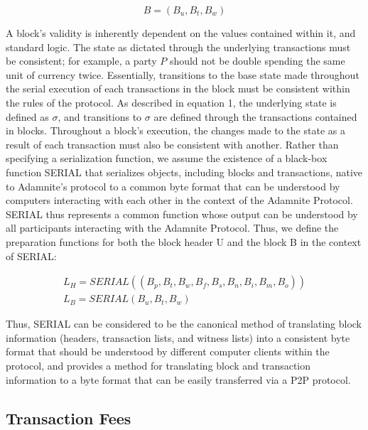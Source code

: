 \documentclass[conference]{IEEEtran}
\begin{document}
\begin{equation}
{B} = (B_{u}, B_{t}, B_{w})
\end{equation}

A block's validity is inherently dependent on the values contained within it, and standard logic. The state as dictated through the underlying transactions must be consistent; for example, a party $P$ should not be double spending the same unit of currency twice. Essentially, transitions to the base state made throughout the serial execution of each transactions in the block must be consistent within the rules of the protocol. As described in equation 1, the underlying state is defined as $\sigma$, and transitions to $\sigma$ are defined through the transactions contained in blocks. Throughout a block's execution, the changes made to the state as a result of each transaction must also be consistent with another.
Rather than specifying a serialization function, we assume the existence of a black-box function SERIAL that serializes objects, including blocks and transactions, native to Adamnite's protocol to a common byte format that can be understood by computers interacting with each other in the context of the Adamnite Protocol. SERIAL thus represents a common function whose output can be understood by all participants interacting with the Adamnite Protocol. Thus, we define the preparation functions for both the block header U and the block B in the context of SERIAL:

\begin{eqnarray}
{L_{H} = SERIAL((B_p,B_t,B_w,B_f,B_s,B_n,B_i,B_m,B_o))}\\
{L_{B}} = SERIAL(B_{u},B_{t},B_{w})
\end{eqnarray}


Thus, SERIAL can be considered to be the canonical method of translating block information (headers, transaction lists, and witness lists) into a consistent byte format that should be understood by different computer clients within the protocol, and provides a method for translating block and transaction information to a byte format that can be easily transferred via a P2P protocol.



\subsection{Transaction Fees}
\end{document}
